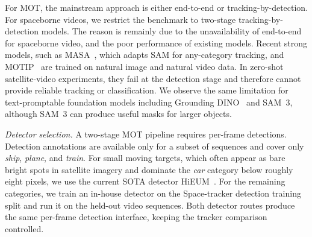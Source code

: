 \documentclass{article}
\begin{document}

For MOT, the mainstream approach is either end-to-end or tracking-by-detection. For spaceborne videos, we restrict the benchmark to two-stage tracking-by-detection models. The reason is remainly due to the unavailability of end-to-end for spaceborne video, and the poor performance of existing models. Recent strong models, such as MASA~\citep{li2024masa}, which adapts SAM for any-category tracking, and MOTIP~\citep{gao2024motip} are trained on natural image and natural video data. In zero-shot satellite-video experiments, they fail at the detection stage and therefore cannot provide reliable tracking or classification. We observe the same limitation for text-promptable foundation models including Grounding DINO~\citep{liu2024groundingdino} and SAM~3, although SAM~3 can produce useful masks for larger objects.

\textit{Detector selection.}
A two-stage MOT pipeline requires per-frame detections. Detection annotations are available only for a subset of sequences and cover only \textit{ship}, \textit{plane}, and \textit{train}. For small moving targets, which often appear as bare bright spots in satellite imagery and dominate the \textit{car} category below roughly eight pixels, we use the current SOTA detector HiEUM~\citep{Xiao2024HiEUM}. For the remaining categories, we train an in-house detector on the Space-tracker detection training split and run it on the held-out video sequences. Both detector routes produce the same per-frame detection interface, keeping the tracker comparison controlled.
\end{document}
